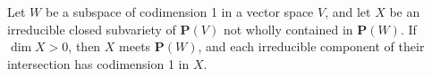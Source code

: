 Let $W$ be a subspace of codimension 1 in a vector space $V$, and let $X$ be an irreducible closed subvariety of $\mathbf{P}(V)$ not wholly contained in $\mathbf{P}(W)$. If $\dim X > 0$, then $X$ meets $\mathbf{P}(W)$, and each irreducible component of their intersection has codimension 1 in $X$.
